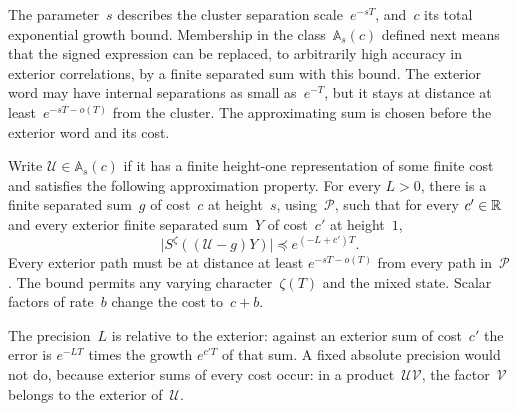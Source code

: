 The parameter~$s$ describes the cluster separation scale~$e^{-sT}$, and~$c$ its total exponential growth bound. Membership in the class~$\mathbb A_s(c)$ defined next means that the signed expression can be replaced, to arbitrarily high accuracy in exterior correlations, by a finite separated sum with this bound. The exterior word may have internal separations as small as~$e^{-T}$, but it stays at distance at least~$e^{-sT-o(T)}$ from the cluster. The approximating sum is chosen before the exterior word and its cost.

Write $\mathcal U\in\mathbb A_s(c)$ if it has a finite height-one representation of some finite cost and satisfies the following approximation property. For every $L>0$, there is a finite separated sum~$g$ of cost~$c$ at height~$s$, using~$\mathcal P$, such that for every $c'\in\mathbb{R}$ and every exterior finite separated sum~$Y$ of cost~$c'$ at height~$1$,
\begin{equation}\label{eq:J-layer-precision}
\big|S^\zeta((\mathcal U-g)Y)\big|\preccurlyeq e^{(-L+c')T}.
\end{equation}
Every exterior path must be at distance at least $e^{-sT-o(T)}$ from every path in~$\mathcal P$. The bound permits any varying character~$\zeta(T)$ and the mixed state. Scalar factors of rate~$b$ change the cost to~$c+b$.

The precision~$L$ is relative to the exterior: against an exterior sum of cost~$c'$ the error is $e^{-LT}$ times the growth $e^{c'T}$ of that sum. A fixed absolute precision would not do, because exterior sums of every cost occur: in a product~$\mathcal U\mathcal V$, the factor~$\mathcal V$ belongs to the exterior of~$\mathcal U$.

